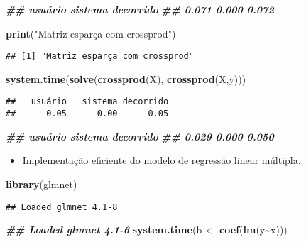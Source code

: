 \documentclass[
]{article}
\newenvironment{Shaded}{\begin{snugshade}}{\end{snugshade}}
\newcommand{\DocumentationTok}[1]{\textcolor[rgb]{0.56,0.35,0.01}{\textbf{\textit{#1}}}}
\newcommand{\FunctionTok}[1]{\textcolor[rgb]{0.13,0.29,0.53}{\textbf{#1}}}
\newcommand{\NormalTok}[1]{#1}
\newcommand{\OtherTok}[1]{\textcolor[rgb]{0.56,0.35,0.01}{#1}}
\newcommand{\SpecialCharTok}[1]{\textcolor[rgb]{0.81,0.36,0.00}{\textbf{#1}}}
\newcommand{\StringTok}[1]{\textcolor[rgb]{0.31,0.60,0.02}{#1}}
\providecommand{\tightlist}{%
  \setlength{\itemsep}{0pt}\setlength{\parskip}{0pt}}
\begin{document}
\begin{Shaded}
\begin{Highlighting}[]
\DocumentationTok{\#\# usuário sistema decorrido}
\DocumentationTok{\#\# 0.071 0.000 0.072}

\FunctionTok{print}\NormalTok{(}\StringTok{"Matriz esparça com crossprod"}\NormalTok{)}
\end{Highlighting}
\end{Shaded}

\begin{verbatim}
## [1] "Matriz esparça com crossprod"
\end{verbatim}

\begin{Shaded}
\begin{Highlighting}[]
\FunctionTok{system.time}\NormalTok{(}\FunctionTok{solve}\NormalTok{(}\FunctionTok{crossprod}\NormalTok{(X), }\FunctionTok{crossprod}\NormalTok{(X,y)))}
\end{Highlighting}
\end{Shaded}

\begin{verbatim}
##   usuário   sistema decorrido 
##      0.05      0.00      0.05
\end{verbatim}

\begin{Shaded}
\begin{Highlighting}[]
\DocumentationTok{\#\# usuário sistema decorrido}
\DocumentationTok{\#\# 0.029 0.000 0.050}
\end{Highlighting}
\end{Shaded}

\begin{itemize}
\tightlist
\item
  Implementação eficiente do modelo de regressão linear múltipla.
\end{itemize}

\begin{Shaded}
\begin{Highlighting}[]
\FunctionTok{library}\NormalTok{(glmnet)}
\end{Highlighting}
\end{Shaded}

\begin{verbatim}
## Loaded glmnet 4.1-8
\end{verbatim}

\begin{Shaded}
\begin{Highlighting}[]
\DocumentationTok{\#\# Loaded glmnet 4.1{-}6}
\FunctionTok{system.time}\NormalTok{(b }\OtherTok{\textless{}{-}} \FunctionTok{coef}\NormalTok{(}\FunctionTok{lm}\NormalTok{(y}\SpecialCharTok{\textasciitilde{}}\NormalTok{x)))}
\end{Highlighting}
\end{Shaded}
\end{document}
